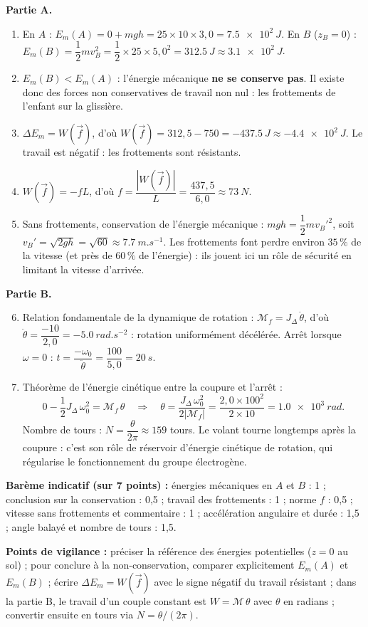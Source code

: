 \documentclass[11pt]{article}
\begin{document}
\begin{corrige}
\textbf{Partie A.}
\begin{enumerate}
\item En $A$ : $E_m(A) = 0 + mgh = 25 \times 10 \times 3{,}0 = \SI{7,5e2}{J}$. En $B$ ($z_B = 0$) : $E_m(B) = \dfrac{1}{2}mv_B^2 = \dfrac{1}{2} \times 25 \times 5{,}0^2 = \SI{312,5}{J} \approx \SI{3,1e2}{J}$.
\item $E_m(B) < E_m(A)$ : l'énergie mécanique \textbf{ne se conserve pas}. Il existe donc des forces non conservatives de travail non nul : les frottements de l'enfant sur la glissière.
\item $\Delta E_m = W(\vec{f})$, d'où $W(\vec{f}) = 312{,}5 - 750 = \SI{-437,5}{J} \approx \SI{-4,4e2}{J}$. Le travail est négatif : les frottements sont résistants.
\item $W(\vec{f}) = -fL$, d'où $f = \dfrac{|W(\vec{f})|}{L} = \dfrac{437{,}5}{6{,}0} \approx \SI{73}{N}$.
\item Sans frottements, conservation de l'énergie mécanique : $mgh = \dfrac{1}{2}mv_B'^2$, soit $v_B' = \sqrt{2gh} = \sqrt{60} \approx \SI{7,7}{m.s^{-1}}$. Les frottements font perdre environ $35\,\%$ de la vitesse (et près de $60\,\%$ de l'énergie) : ils jouent ici un rôle de sécurité en limitant la vitesse d'arrivée.
\end{enumerate}
\textbf{Partie B.}
\begin{enumerate}
\setcounter{enumi}{5}
\item Relation fondamentale de la dynamique de rotation : $\mathcal{M}_f = J_\Delta\,\ddot{\theta}$, d'où $\ddot{\theta} = \dfrac{-10}{2{,}0} = \SI{-5,0}{rad.s^{-2}}$ : rotation uniformément décélérée. Arrêt lorsque $\omega = 0$ : $t = \dfrac{-\omega_0}{\ddot{\theta}} = \dfrac{100}{5{,}0} = \SI{20}{s}$.
\item Théorème de l'énergie cinétique entre la coupure et l'arrêt :
\[ 0 - \frac{1}{2}J_\Delta\,\omega_0^2 = \mathcal{M}_f\,\theta \quad\Rightarrow\quad \theta = \frac{J_\Delta\,\omega_0^2}{2|\mathcal{M}_f|} = \frac{2{,}0 \times 100^2}{2 \times 10} = \SI{1,0e3}{rad}. \]
Nombre de tours : $N = \dfrac{\theta}{2\pi} \approx 159$ tours. Le volant tourne longtemps après la coupure : c'est son rôle de réservoir d'énergie cinétique de rotation, qui régularise le fonctionnement du groupe électrogène.
\end{enumerate}
\textbf{Barème indicatif (sur 7 points) :} énergies mécaniques en $A$ et $B$ : 1 ; conclusion sur la conservation : 0,5 ; travail des frottements : 1 ; norme $f$ : 0,5 ; vitesse sans frottements et commentaire : 1 ; accélération angulaire et durée : 1,5 ; angle balayé et nombre de tours : 1,5.

\textbf{Points de vigilance :} préciser la référence des énergies potentielles ($z = 0$ au sol) ; pour conclure à la non-conservation, comparer explicitement $E_m(A)$ et $E_m(B)$ ; écrire $\Delta E_m = W(\vec{f})$ avec le signe négatif du travail résistant ; dans la partie B, le travail d'un couple constant est $W = \mathcal{M}\,\theta$ avec $\theta$ en radians ; convertir ensuite en tours via $N = \theta/(2\pi)$.
\end{corrige}
\end{document}
